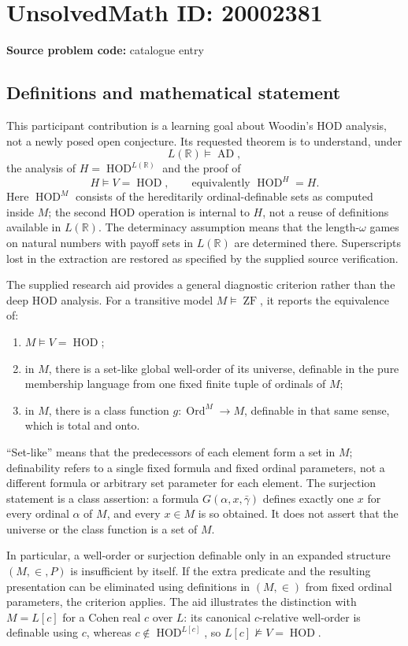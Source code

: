 \documentclass[11pt]{article}
\newcommand{\R}{\mathbb{R}}
\begin{document}
\section*{UnsolvedMath ID: 20002381}
\textbf{Source problem code:} catalogue entry
\subsection{Definitions and mathematical statement}
This participant contribution is a learning goal about Woodin's HOD analysis, not a newly posed open conjecture. Its requested theorem is to understand, under
\[
 L(\R)\models\operatorname{AD},
\]
the analysis of $H=\operatorname{HOD}^{L(\R)}$ and the proof of
\[
 H\models V=\operatorname{HOD},
 \qquad\text{equivalently }\operatorname{HOD}^{H}=H.
\]
Here $\operatorname{HOD}^M$ consists of the hereditarily ordinal-definable sets as computed inside $M$; the second HOD operation is internal to $H$, not a reuse of definitions available in $L(\R)$. The determinacy assumption means that the length-$\omega$ games on natural numbers with payoff sets in $L(\R)$ are determined there. Superscripts lost in the extraction are restored as specified by the supplied source verification.

The supplied research aid provides a general diagnostic criterion rather than the deep HOD analysis. For a transitive model $M\models\operatorname{ZF}$, it reports the equivalence of:
\begin{enumerate}
\item $M\models V=\operatorname{HOD}$;
\item in $M$, there is a set-like global well-order of its universe, definable in the pure membership language from one fixed finite tuple of ordinals of $M$;
\item in $M$, there is a class function $g:\operatorname{Ord}^M\to M$, definable in that same sense, which is total and onto.
\end{enumerate}
``Set-like'' means that the predecessors of each element form a set in $M$; definability refers to a single fixed formula and fixed ordinal parameters, not a different formula or arbitrary set parameter for each element. The surjection statement is a class assertion: a formula $G(\alpha,x,\bar\gamma)$ defines exactly one $x$ for every ordinal $\alpha$ of $M$, and every $x\in M$ is so obtained. It does not assert that the universe or the class function is a set of $M$.

In particular, a well-order or surjection definable only in an expanded structure $(M,\in,P)$ is insufficient by itself. If the extra predicate and the resulting presentation can be eliminated using definitions in $(M,\in)$ from fixed ordinal parameters, the criterion applies. The aid illustrates the distinction with $M=L[c]$ for a Cohen real $c$ over $L$: its canonical $c$-relative well-order is definable using $c$, whereas $c\notin\operatorname{HOD}^{L[c]}$, so $L[c]\not\models V=\operatorname{HOD}$.
\end{document}
